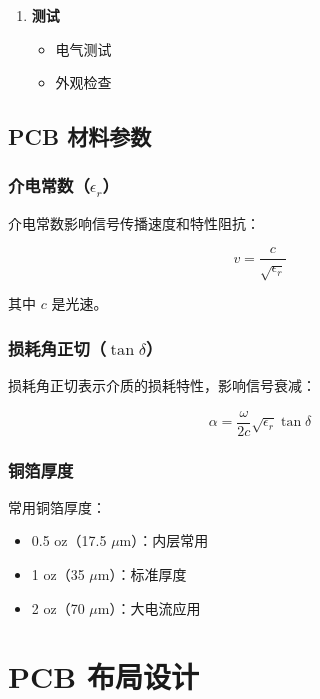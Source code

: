\begin{enumerate}
  \item \textbf{测试}
    \begin{itemize}
      \item 电气测试
      \item 外观检查
    \end{itemize}
\end{enumerate}

\subsection{PCB 材料参数}

\subsubsection{介电常数（\texorpdfstring{$\epsilon_r$}{epsilon-r}）}

介电常数影响信号传播速度和特性阻抗：

\begin{equation}
v = \frac{c}{\sqrt{\epsilon_r}} \label{eq:signal-velocity}
\end{equation}

其中 $c$ 是光速。

\subsubsection{损耗角正切（\texorpdfstring{$\tan \delta$}{tan delta}）}

损耗角正切表示介质的损耗特性，影响信号衰减：

\begin{equation}
\alpha = \frac{\omega}{2c} \sqrt{\epsilon_r} \tan \delta \label{eq:attenuation}
\end{equation}

\subsubsection{铜箔厚度}

常用铜箔厚度：
\begin{itemize}
  \item 0.5 oz（17.5 $\mu$m）：内层常用
  \item 1 oz（35 $\mu$m）：标准厚度
  \item 2 oz（70 $\mu$m）：大电流应用
\end{itemize}

\section{PCB 布局设计}

